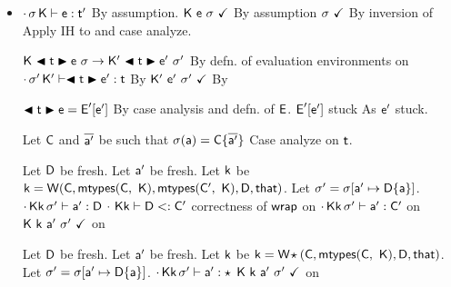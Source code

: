 \documentclass[acmlarge, anonymous, authordraft]{acmart}
\begin{document}
\begin{itemize}
  \item {}
\begin{proofy}
\stepp[base] $\EnvType\cdot\s\K\e\tp$ \basis By assumption.
\stepp[progform] ${\sf{K}}~{\sf{e}}~\sigma~\checkmark$ \basis By assumption
\stepp[inpswf] $\sigma~\checkmark$ \basis By inversion of 
\stepp Apply IH to  and case analyze.
\begin{casel}
  \caseof{ \begin{iknown}
    \stepp[kred] $\Reduce\K\e\s\Kp\ep\sp$
    \stepp[kbase] $\WFp\Kp{\ep~\sp}$
    \stepp $\EnvType\cdot\sp\Kp\ep\tp$
    \end{iknown}} 
  \begin{proofy}
  \stepp $\Reduce\K{\BehCast{\t}{\e}}\s\Kp{\BehCast{\t}{\ep}}\sp$ \basis By defn. of evaluation environments on 
  \stepp[ktype] $\EnvType\cdot\sp\Kp{\BehCast\t\ep}\t$ \basis By 
  \stepp $\WFp\Kp{\ep~\sp}$ \basis By 
  \end{proofy}
  \begin{proofy}
    \stepp $\BehCast\t\e = \EE'[\ep]$ \basis By case analysis and defn. of $\textsf{{E}}$.
    \stepp $\textsf{{E}}'[{{{\sf{e'}}}}]$ stuck \basis As ${{{\sf{e'}}}}$ stuck.
  \end{proofy}
  \caseof{$\e = \a$}
  \begin{proofy}
    \stepp Let ${\sf{C}}$ and $\overline{{\sf{a}}'}$ be such that $\sigma({\sf{a}}) = {\sf{C}}\{\overline{{\sf{a}}'}\}$
    \stepp Case analyze on $\t$.
    \begin{casel}
      \caseof{$\t = \Cp$}
      \begin{proofy}
        \stepp Let ${\sf{D}}$ be fresh.
        \stepp Let ${\sf{a}}'$ be fresh.
        \stepp[wcorr] Let ${\sf{k}}$ be ${\sf{k}} = {\sf{W}}({\sf{C}},{\sf{mtypes}}({\sf{C}},~{\sf{K}}),{\sf{mtypes}}({\sf{C'}},~{\sf{K}}),{\sf{D}},{\sf{that}})$.
        \stepp Let ${{\sigma'}} = \sigma[{\sf{a}}' \mapsto {\sf{D}}\{{\sf{a}}\}]$.
        \stepp[b2] $\cdot\,{\sf{K}}{\sf{k}}\,{{\sigma'}}\vdash {\sf{a}}' : {\sf{D}}$ \basis {}
        \stepp[b1] $\cdot~{\sf{K}}{\sf{k}}\vdash {\sf{D}}<: {\sf{C'}}$ \basis correctness of ${\sf{wrap}}$ on 
        \stepp[wth] $\cdot\,{\sf{K}}{\sf{k}}\,{{\sigma'}}\vdash {\sf{a}}' : {\sf{C'}}$ \basis {} on 
        \stepp ${\sf{K}} ~ {\sf{k}}~{\sf{a}}'~{{\sigma'}}~\checkmark$ \basis {} on 
      \end{proofy}
      \caseof{$\t = \any$}
      \begin{proofy}
        \stepp Let ${\sf{D}}$ be fresh.
        \stepp Let ${\sf{a}}'$ be fresh.
        \stepp[wcorr2] Let ${\sf{k}}$ be ${\sf{k}} = {\sf{W}}\!\star({\sf{C}},{\sf{mtypes}}({\sf{C}},~{\sf{K}}),{\sf{D}},{\sf{that}})$.
        \stepp Let ${{\sigma'}} = \sigma[{\sf{a}}' \mapsto {\sf{D}}\{{\sf{a}}\}]$.
        \stepp[b21] $\cdot\,{\sf{K}}{\sf{k}}\,{{\sigma'}}\vdash {\sf{a}}' : \star$ \basis {}
        \stepp ${\sf{K}} ~ {\sf{k}}~{\sf{a}}'~{{\sigma'}}~\checkmark$ \basis {} on 
      \end{proofy}
    \end{casel}
  \end{proofy}
\end{casel}
\end{proofy}
  

\end{itemize}
\end{document}
